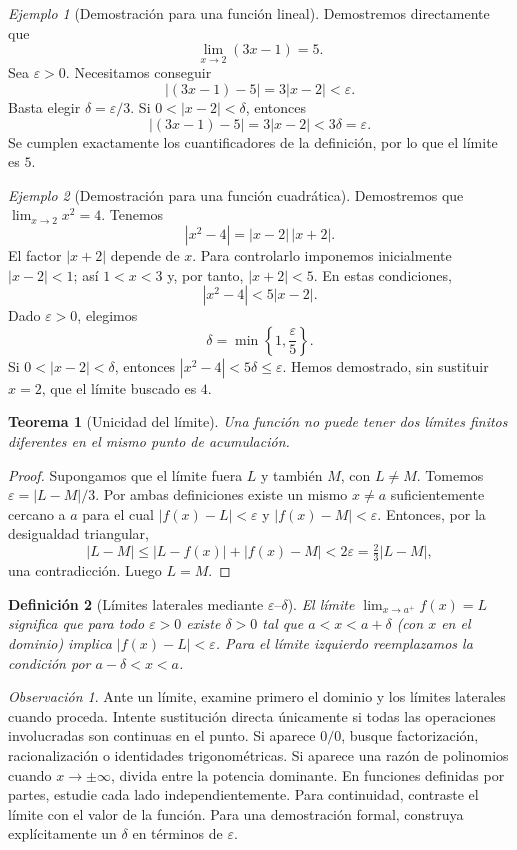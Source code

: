 \documentclass[12pt]{article}
\newtheorem{definicion}{Definición}[section]
\newtheorem{teorema}[definicion]{Teorema}
\theoremstyle{remark}
\newtheorem{observacion}{Observación}
\newtheorem{ejemplo}{Ejemplo}
\begin{document}
\begin{ejemplo}[Demostración para una función lineal]
Demostremos directamente que
\[\lim_{x\to2}(3x-1)=5.\]
Sea $\varepsilon>0$. Necesitamos conseguir
\[
|(3x-1)-5|=3|x-2|<\varepsilon.
\]
Basta elegir $\delta=\varepsilon/3$. Si $0<|x-2|<\delta$, entonces
\[
|(3x-1)-5|=3|x-2|<3\delta=\varepsilon.
\]
Se cumplen exactamente los cuantificadores de la definición, por lo que el límite es $5$.
\end{ejemplo}

\begin{ejemplo}[Demostración para una función cuadrática]
Demostremos que $\lim_{x\to2}x^2=4$. Tenemos
\[
|x^2-4|=|x-2|\,|x+2|.
\]
El factor $|x+2|$ depende de $x$. Para controlarlo imponemos inicialmente $|x-2|<1$; así $1<x<3$ y, por tanto, $|x+2|<5$. En estas condiciones,
\[
|x^2-4|<5|x-2|.
\]
Dado $\varepsilon>0$, elegimos
\[
\boxed{\delta=\min\left\{1,\frac{\varepsilon}{5}\right\}.}
\]
Si $0<|x-2|<\delta$, entonces $|x^2-4|<5\delta\le\varepsilon$. Hemos demostrado, sin sustituir $x=2$, que el límite buscado es $4$.
\end{ejemplo}

\begin{teorema}[Unicidad del límite]
Una función no puede tener dos límites finitos diferentes en el mismo punto de acumulación.
\end{teorema}
\begin{proof}
Supongamos que el límite fuera $L$ y también $M$, con $L\ne M$. Tomemos $\varepsilon=|L-M|/3$. Por ambas definiciones existe un mismo $x\ne a$ suficientemente cercano a $a$ para el cual $|f(x)-L|<\varepsilon$ y $|f(x)-M|<\varepsilon$. Entonces, por la desigualdad triangular,
\[
|L-M|\le |L-f(x)|+|f(x)-M|<2\varepsilon=\tfrac23|L-M|,
\]
una contradicción. Luego $L=M$.
\end{proof}

\begin{definicion}[Límites laterales mediante $\varepsilon$--$\delta$]
El límite $\lim_{x\to a^+}f(x)=L$ significa que para todo $\varepsilon>0$ existe $\delta>0$ tal que $a<x<a+\delta$ (con $x$ en el dominio) implica $|f(x)-L|<\varepsilon$. Para el límite izquierdo reemplazamos la condición por $a-\delta<x<a$.
\end{definicion}


\begin{observacion}
Ante un límite, examine primero el dominio y los límites laterales cuando proceda. Intente sustitución directa únicamente si todas las operaciones involucradas son continuas en el punto. Si aparece $0/0$, busque factorización, racionalización o identidades trigonométricas. Si aparece una razón de polinomios cuando $x\to\pm\infty$, divida entre la potencia dominante. En funciones definidas por partes, estudie cada lado independientemente. Para continuidad, contraste el límite con el valor de la función. Para una demostración formal, construya explícitamente un $\delta$ en términos de $\varepsilon$.
\end{observacion}
\newpage
\end{document}
